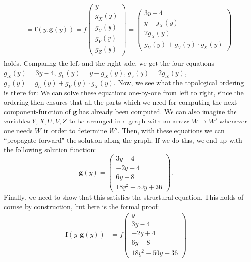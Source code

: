 \begin{gradedsolution}
\begin{enumerate}
\begin{align}
\begin{split}
        \\ &	  = \boldsymbol{f}(y, \boldsymbol{g}(y))  = 
	  f \begin{pmatrix} y \\ g_X(y) \\ g_U(y) \\ g_V(y) \\ g_Z(y)\end{pmatrix} = \begin{pmatrix} 3y - 4 \\ y - g_X(y) \\ 2g_X(y) \\ g_U(y) + g_V(y) \cdot g_X(y)\end{pmatrix}
	\end{split}
	  \label{eq:eq_constraint}
	\end{align}
	holds.
	Comparing the left and the right side, we get the four equations $g_X(y) = 3y - 4$, $g_U(y) = y - g_X(y)$, $g_V(y) = 2g_X(y)$, $g_Z(y) = g_U(y) + g_V(y) \cdot g_X(y)$.
	Now, we see what the topological ordering is there for: We can solve these equations one-by-one from left to right, since the ordering then ensures that all the parts which we need for computing the next component-function of $\boldsymbol{g}$ has already been computed.
	We can also imagine the variables $Y, X, U, V, Z$ to be arranged in a graph with an arrow $W \to W'$ whenever one needs $W$ in order to determine $W'$. Then, with these equations we can ``propagate forward'' the solution along the graph.
	If we do this, we end up with the following solution function:
	\begin{equation}
	  \boldsymbol{g}(y) = \begin{pmatrix} 3y - 4 \\ -2y + 4 \\ 6y - 8 \\ 18y^{2} - 50y + 36\end{pmatrix}.
	  \label{eq:the_solution_function}
	\end{equation}
	Finally, we need to show that this satisfies the structural equation.
	This holds of course by construction, but here is the formal proof:
	\begin{align*}
	  \boldsymbol{f}(y, \boldsymbol{g}(y)) & = f 
	  \begin{pmatrix} y \\ 3y - 4 \\ -2y + 4 \\ 6y - 8 \\ 18y^{2} - 50y + 36\end{pmatrix}  

\end{align*}
\end{enumerate}
\end{gradedsolution}
